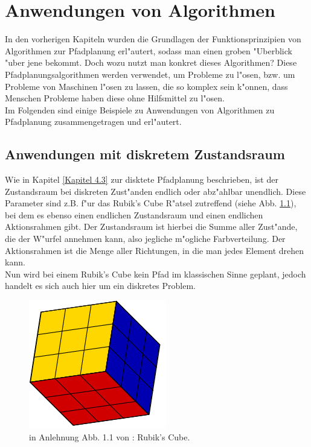 \chapter{Anwendungen von Algorithmen}
In den vorherigen Kapiteln wurden die Grundlagen der Funktionsprinzipien von Algorithmen zur Pfadplanung erl"autert, sodass man einen groben "Uberblick "uber jene bekommt. Doch wozu nutzt man konkret dieses Algorithmen? Diese Pfadplanungsalgorithmen werden verwendet, um Probleme zu l"osen, bzw. um Probleme von Maschinen l"osen zu lassen, die so komplex sein k"onnen, dass Menschen Probleme haben diese ohne Hilfsmittel zu l"osen.\\
Im Folgenden sind einige Beispiele zu Anwendungen von Algorithmen zu Pfadplanung zusammengetragen und erl"autert.

\section{Anwendungen mit diskretem Zustandsraum}
Wie in Kapitel \ref{Kapitel 4.3} zur disktete Pfadplanung beschrieben, ist der Zustandsraum bei diskreten Zust"anden endlich oder abz"ahlbar unendlich. Diese Parameter sind z.B. f"ur das Rubik's Cube R"atsel zutreffend (siehe Abb. \ref{Abb. 5.1}), bei dem es ebenso einen endlichen Zustandsraum und einen endlichen Aktionsrahmen gibt. Der Zustandsraum ist hierbei die Summe aller Zust"ande, die der W"urfel annehmen kann, also jegliche m"ogliche Farbverteilung. Der Aktionsrahmen ist die Menge aller Richtungen, in die man jedes Element drehen kann.\\ Nun wird bei einem Rubik's Cube kein Pfad im klassischen Sinne geplant, jedoch handelt es sich auch hier um ein diskretes Problem.\\
\begin{figure}
	\centering
	\includegraphics[width=0.4\linewidth]{images/img229}
	\caption{in Anlehnung Abb. 1.1 von \cite[~S. 5]{Lav06}: Rubik's Cube.}
	\label{Abb. 5.1}
\end{figure}


